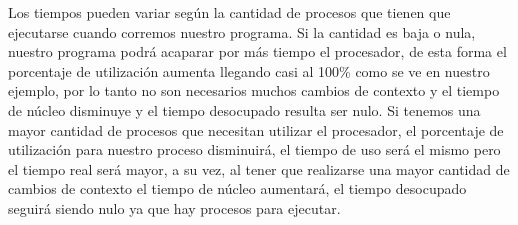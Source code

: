 \documentclass[11pt]{article}
\begin{document}
Los tiempos pueden variar según la cantidad de procesos que tienen que ejecutarse
cuando corremos nuestro programa. Si la cantidad es baja o nula, nuestro programa
podrá acaparar por más tiempo el procesador, de esta forma el porcentaje de utilización
aumenta llegando casi al 100\% como se ve en nuestro ejemplo, por lo tanto
no son necesarios muchos cambios de contexto y el tiempo de núcleo disminuye
y el tiempo desocupado resulta ser nulo.
Si tenemos una mayor cantidad de procesos que necesitan utilizar el procesador,
el porcentaje de utilización para nuestro proceso disminuirá, el tiempo de uso
será el mismo pero el tiempo real será mayor, a su vez, al tener que realizarse
una mayor cantidad de cambios de contexto el tiempo de núcleo aumentará, el
tiempo desocupado seguirá siendo nulo ya que hay procesos para ejecutar.
\end{document}
